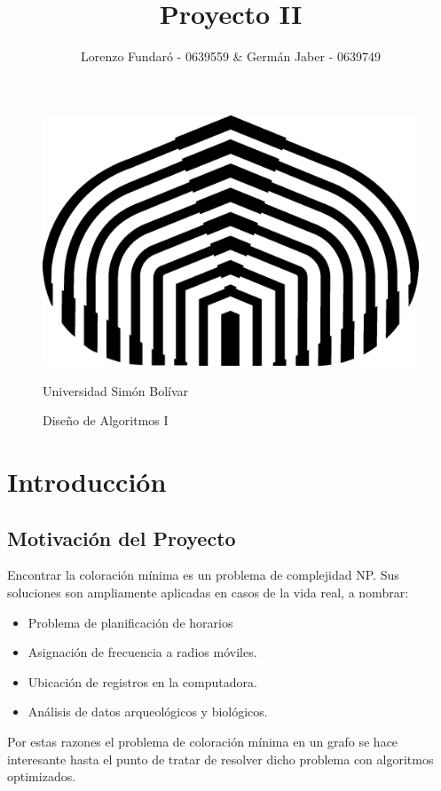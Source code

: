 \documentclass[a4paper,10pt]{article}
\title{Proyecto II}
\author{Lorenzo Fundar\'o - 0639559 & Germán Jaber - 0639749}
\begin{document}
\begin{figure}[t]
\begin{center}
\includegraphics[scale = 0.75]{usb.png}
\end{center}
\begin{center}
\large Universidad Simón Bolívar
\end{center}
\begin{center}
 \large Diseño de Algoritmos I
\end{center}


\end{figure}


\maketitle


\thispagestyle{empty}
\newpage

\tableofcontents{}
\newpage


\section{Introducción}

\subsection{Motivación del Proyecto}
Encontrar la coloración mínima es un problema de complejidad NP. 
Sus soluciones son ampliamente aplicadas en casos de la vida real, a nombrar:
\begin{itemize}
 \item Problema de planificación de horarios
 \item Asignación de frecuencia a radios móviles.
 \item Ubicación de registros en la computadora.
 \item Análisis de datos arqueológicos y biológicos.
\end{itemize}
Por estas razones el problema de coloración mínima en un grafo se hace 
interesante hasta el punto de tratar de resolver dicho problema con 
algoritmos optimizados.
\end{document}
